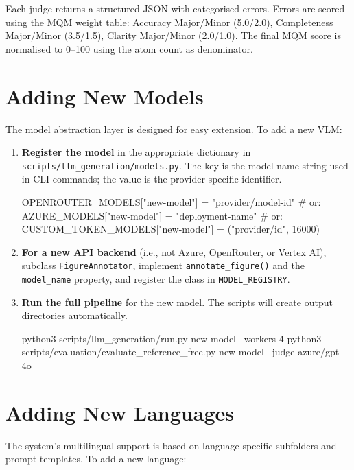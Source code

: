 \noindent Each judge returns a structured JSON with categorised errors. Errors are scored using the MQM weight table: Accuracy Major/Minor (5.0/2.0), Completeness Major/Minor (3.5/1.5), Clarity Major/Minor (2.0/1.0). The final MQM score is normalised to 0--100 using the atom count as denominator.

\section{Adding New Models}

The model abstraction layer is designed for easy extension. To add a new VLM:

\begin{enumerate}[leftmargin=*]
\item \textbf{Register the model} in the appropriate dictionary in \texttt{scripts/llm\_generation/models.py}. The key is the model name string used in CLI commands; the value is the provider-specific identifier.
\begin{codebox}[title={\scriptsize models.py}]
{\scriptsize OPENROUTER_MODELS["new-model"] = "provider/model-id"
# or: AZURE_MODELS["new-model"] = "deployment-name"
# or: CUSTOM_TOKEN_MODELS["new-model"] = ("provider/id", 16000)}
\end{codebox}

\item \textbf{For a new API backend} (i.e., not Azure, OpenRouter, or Vertex AI), subclass \texttt{FigureAnnotator}, implement \texttt{annotate\_figure()} and the \texttt{model\_name} property, and register the class in \texttt{MODEL\_REGISTRY}.

\item \textbf{Run the full pipeline} for the new model. The scripts will create output directories automatically.
\begin{codebox}[title={\scriptsize Run new model}]
{\scriptsize python3 scripts/llm_generation/run.py new-model --workers 4
python3 scripts/evaluation/evaluate_reference_free.py new-model --judge azure/gpt-4o}
\end{codebox}
\end{enumerate}

\section{Adding New Languages}

The system's multilingual support is based on language-specific subfolders and prompt templates. To add a new language:

